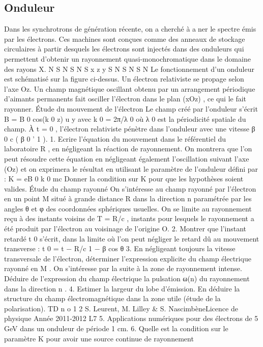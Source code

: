 \subsection{Onduleur}%
Dans les synchrotrons de génération récente, on a cherché à aner le spectre émis par les
électrons. Ces machines sont conçues comme des anneaux de stockage circulaires à partir desquels
les électrons sont injectés dans des onduleurs qui permettent d'obtenir un rayonnement quasi-monochromatique dans le domaine des rayons X.
N
S N
S N
S
x
z
y
S
N S
N S
N
Le fonctionnement d'un onduleur est schématisé sur la figure ci-dessus. Un électron relativiste
se propage selon l'axe Oz. Un champ magnétique oscillant obtenu par un arrangement périodique
d'aimants permanents fait osciller l'électron dans le plan (xOz) , ce qui le fait rayonner.
Étude du mouvement de l'électron
Le champ créé par l'onduleur s'écrit B = B 0 cos(k 0 z) u y avec k 0 = 2π/λ 0 où λ 0 est la périodicité spatiale du champ. À t = 0 , l'électron relativiste pénètre dans l'onduleur avec une vitesse
β 0 c ( β 0 ' 1 ).
1. Ecrire l'équation du mouvement dans le référentiel du laboratoire R , en négligeant la réaction de rayonnement. On montrera que l'on peut résoudre cette équation en négligeant
également l'oscillation suivant l'axe (Oz) et on exprimera le résultat en utilisant le paramètre de l'onduleur défini par :
K =
eB 0
k 0 mc
Donner la condition sur K pour que les hypothèses soient valides.
Étude du champ rayonné
On s'intéresse au champ rayonné par l'électron en un point M situé à grande distance R dans
la direction n paramétrée par les angles θ et φ des coordonnées sphériques usuelles. On se limite
au rayonnement reçu à des instants voisins de T = R/c , instants pour lesquels le rayonnement a
été produit par l'électron au voisinage de l'origine O.
2. Montrer que l'instant retardé t 0 s'écrit, dans la limite où l'on peut négliger le retard dû au
mouvement transverse :
t 0 =
t − R/c
1 − β cos θ
3. En négligeant toujours la vitesse transversale de l'électron, déterminer l'expression explicite
du champ électrique rayonné en M . On s'intéresse par la suite à la zone de rayonnement
intense. Déduire de l'expression du champ électrique la pulsation ω(n) du rayonnement
dans la direction n .
4. Estimer la largeur du lobe d'émission. En déduire la structure du champ électromagnétique
dans la zone utile (étude de la polarisation).
TD n o 1
2
S. Leurent, M. Lilley & S. NascimbèneLicence de physique
Année 2011-2012
L7
5. Applications numériques pour des électrons de 5 GeV dans un onduleur de période 1 cm.
6. Quelle est la condition sur le paramètre K pour avoir une source continue de rayonnement
